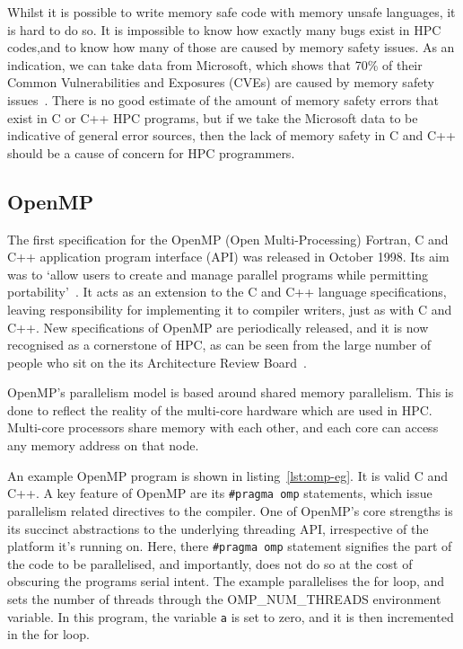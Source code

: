 Whilst it is possible to write memory safe code with memory unsafe languages, it is hard to do so. It is impossible to know how exactly many bugs exist in HPC codes,and to know how many of those are caused by memory safety issues.
As an indication, we can take data from Microsoft, which shows that 70\% of their Common Vulnerabilities and Exposures (CVEs) are caused by memory safety issues~\cite{MicroBugs}. There is no good estimate of the amount of memory safety errors that exist in C or C++ HPC programs, but if we take the Microsoft data to be indicative of general error sources, then the lack of memory safety in C and C++ should be a cause of concern for HPC programmers.

\subsection{OpenMP}
The first specification for the OpenMP (Open Multi-Processing) Fortran, C and C++ application program interface (API) was released in October 1998. Its aim was to `allow users to create and manage parallel programs while permitting portability'~\cite{OpenMPSpec}. It acts as an extension to the C and C++ language specifications, leaving responsibility for implementing it to compiler writers, just as with C and C++. New specifications of OpenMP are periodically released, and it is now recognised as a cornerstone of HPC, as can be seen from the large number of people who sit on the its Architecture Review Board~\cite{OpenMPARB}.

OpenMP's parallelism model is based around shared memory parallelism. This is done to reflect the reality of the multi-core hardware which are used in HPC\@. Multi-core processors share memory with each other, and each core can access any memory address on that node.  

An example OpenMP program is shown in listing~\ref{lst:omp-eg}. It is valid C and C++. A key feature of OpenMP are its \texttt{\#pragma omp} statements, which issue parallelism related directives to the compiler. 
One of OpenMP's core strengths is its succinct abstractions to the underlying threading API, irrespective of the platform it's running on. Here, there \texttt{\#pragma omp} statement signifies the part of the code to be parallelised, and importantly, does not do so at the cost of obscuring the programs serial intent.
The example parallelises the for loop, and sets the number of threads through the OMP\_NUM\_THREADS environment variable. In this program, the variable \texttt{a} is set to zero, and it is then incremented in the for loop.

